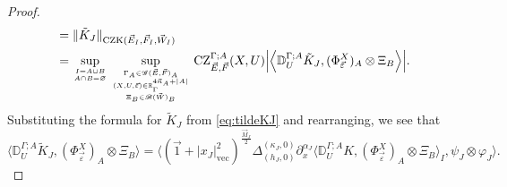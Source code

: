 \documentclass[11pt, reqno]{amsart}
\theoremstyle{definition}
\theoremstyle{remark}
\numberwithin{equation}{section}
\newcommand{\vE}{\vec E}
\newcommand{\vF}{\vec F}
\newcommand{\R}{\mathbb R}
\newcommand{\vn}{\vec n}
\newcommand{\eps}{\varepsilon}
\newcommand{\Bpair}[2]{\Big\langle #1, #2 \Big\rangle}
\newcommand{\abs}[1]{|#1|}
\newcommand{\Babs}[1]{\Big|#1\Big|}
\newcommand{\Norm}[2]{\|#1\|_{#2}}
\begin{document}
\begin{proof}
\begin{equation}
\begin{split}
    &=\Norm{\tilde K_J}{\operatorname{CZK}(\vE_I,\vF_I,\vec W_I)}     \\
    &=\sup_{\genfrac{}{}{0pt}{}{I=A\cup B}{A\cap B=\varnothing}}
    \sup_{\genfrac{}{}{0pt}{}{\genfrac{}{}{0pt}{}{\Gamma_A\in\mathscr G(\vE,\vF)_A}{(X,U,\vec\eps)\in\R^{4\vn_A+\abs{A}}_{\Gamma}}}{
    \Xi_{B}\in \mathscr B(\vec W)_B}}
  \operatorname{CZ}_{\vE,\vF}^{\Gamma;A}(X,U)
  \Babs{\Bpair{\mathbb D^{\Gamma;A}_U
  \tilde K_J
  }{(\Phi_{\vec\eps}^X)_A\otimes \Xi_B}}.
\end{split}
\end{equation}
Substituting the formula for $\tilde K_J$ from \eqref{eq:tildeKJ} and rearranging, we see that
\begin{equation*}
  \Bpair{\mathbb D^{\Gamma;A}_U
  \tilde K_J
  }{(\Phi_{\vec\eps}^X)_A\otimes \Xi_B}
  =\Bpair{ (\vec 1+\abs{x_J}_{\mathrm{vec}}^2)^{\frac{\vec M_J}{2}}\Delta_{(h_J,0)}^{(\kappa_J,0)}\partial_x^{\alpha_J}
    \Bpair{\mathbb D_U^{\Gamma;A} K}{ (\Phi_{\vec\eps}^X)_A\otimes\Xi_B}_I
    }{\psi_J\otimes \varphi_J}.
\end{equation*}


\end{proof}
\end{document}
